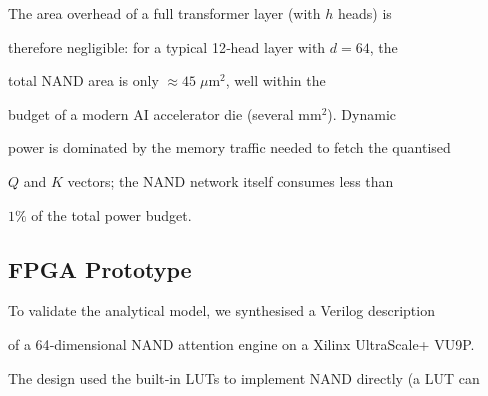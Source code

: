 The area overhead of a full transformer layer (with \(h\) heads) is






therefore negligible: for a typical 12‑head layer with \(d=64\), the






total NAND area is only \(\approx 45\;\mu\text{m}^2\), well within the






budget of a modern AI accelerator die (several \(\text{mm}^2\)).  Dynamic






power is dominated by the memory traffic needed to fetch the quantised






\(Q\) and \(K\) vectors; the NAND network itself consumes less than






\(1\%\) of the total power budget.













\subsection{FPGA Prototype}






\label{subsec:fpga}













To validate the analytical model, we synthesised a Verilog description






of a 64‑dimensional NAND attention engine on a Xilinx UltraScale+ VU9P.






The design used the built‑in LUTs to implement NAND directly (a LUT can






